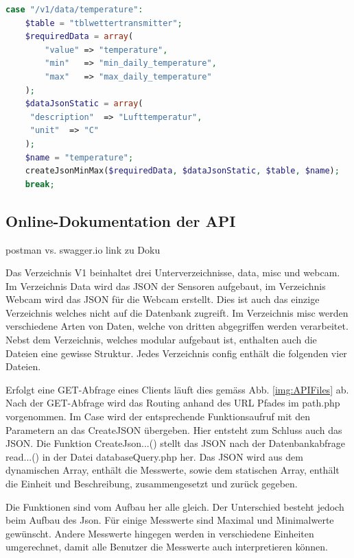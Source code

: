 \begin{lstlisting}[label=lst:path,caption=Beispiel Case zuweisung, language=php, style=php]
case "/v1/data/temperature":
	$table = "tblwettertransmitter";
	$requiredData = array(
		"value" => "temperature",
		"min"  	=> "min_daily_temperature",
		"max"   => "max_daily_temperature"
	);
	$dataJsonStatic = array(
	 "description"  => "Lufttemperatur",
	 "unit"  => "C"
	);
	$name = "temperature";
	createJsonMinMax($requiredData, $dataJsonStatic, $table, $name);
	break;
\end{lstlisting}



\subsection{Online-Dokumentation der API}
postman vs. swagger.io
link zu Doku

Das Verzeichnis V1 beinhaltet drei Unterverzeichnisse, data, misc und webcam. Im Verzeichnis Data wird das JSON der Sensoren aufgebaut, im Verzeichnis Webcam wird das JSON für die Webcam erstellt. Dies ist auch das einzige Verzeichnis welches nicht auf die Datenbank zugreift. Im Verzeichnis misc werden verschiedene Arten von Daten, welche von dritten abgegriffen werden verarbeitet. Nebst dem Verzeichnis, welches modular aufgebaut ist, enthalten auch die Dateien eine gewisse Struktur. Jedes Verzeichnis config enthält die folgenden vier Dateien.


Erfolgt eine GET-Abfrage eines Clients läuft dies gemäss Abb. \ref{img:APIFiles}  ab. Nach der GET-Abfrage wird das Routing anhand des URL Pfades im path.php vorgenommen. Im Case wird der entsprechende Funktionsaufruf mit den Parametern an das CreateJSON übergeben. Hier entsteht zum Schluss auch das JSON. Die Funktion CreateJson...() stellt das JSON nach der Datenbankabfrage read...() in der Datei databaseQuery.php her. Das JSON wird aus dem dynamischen Array, enthält die Messwerte, sowie dem statischen Array, enthält die Einheit und Beschreibung, zusammengesetzt und zurück gegeben.

Die Funktionen sind vom Aufbau her alle gleich. Der Unterschied besteht jedoch beim Aufbau des Json. Für einige Messwerte sind Maximal und Minimalwerte gewünscht. Andere Messwerte hingegen werden in verschiedene Einheiten umgerechnet, damit alle Benutzer die Messwerte auch interpretieren können.
